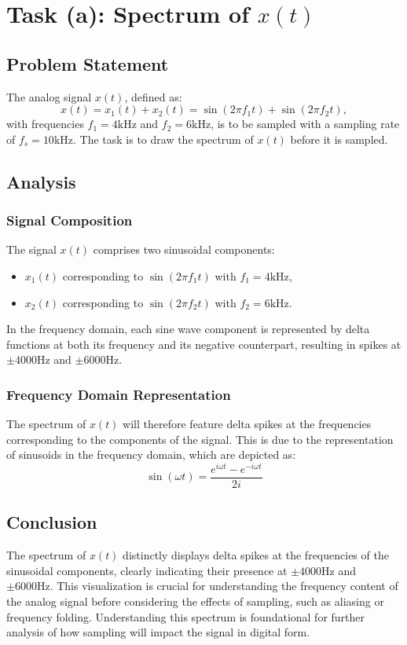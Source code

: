 
\item[(a)]
\section{Task (a): Spectrum of $x(t)$}

\subsection{Problem Statement}
The analog signal $x(t)$, defined as:
$$
x(t) = x_1(t) + x_2(t) = \sin(2\pi f_1 t) + \sin(2\pi f_2 t),
$$
with frequencies $f_1 = 4 \text{kHz}$ and $f_2 = 6 \text{kHz}$, is to be sampled with a sampling rate of $f_s = 10 \text{kHz}$. The task is to draw the spectrum of $x(t)$ before it is sampled.

\subsection{Analysis}
\subsubsection{Signal Composition}
The signal $x(t)$ comprises two sinusoidal components:
\begin{itemize}
    \item $x_1(t)$ corresponding to $\sin(2 \pi f_1 t)$ with $f_1 = 4 \text{kHz}$,
    \item $x_2(t)$ corresponding to $\sin(2 \pi f_2 t)$ with $f_2 = 6 \text{kHz}$.
\end{itemize}
In the frequency domain, each sine wave component is represented by delta functions at both its frequency and its negative counterpart, resulting in spikes at $\pm 4000 \text{Hz}$ and $\pm 6000 \text{Hz}$.

\subsubsection{Frequency Domain Representation}
The spectrum of $x(t)$ will therefore feature delta spikes at the frequencies corresponding to the components of the signal.
This is due to the representation of sinusoids in the frequency domain, which are depicted as:
$$
\sin(\omega t) = \frac{e^{i\omega t} - e^{-i\omega t}}{2i}
$$

\subsection{Conclusion}
The spectrum of $x(t)$ distinctly displays delta spikes at the frequencies of the sinusoidal components,
clearly indicating their presence at $\pm 4000 \text{Hz}$ and $\pm 6000 \text{Hz}$.
This visualization is crucial for understanding the frequency content of the analog signal before considering the effects of sampling,
such as aliasing or frequency folding.
Understanding this spectrum is foundational for further analysis of how sampling will impact the signal in digital form.

